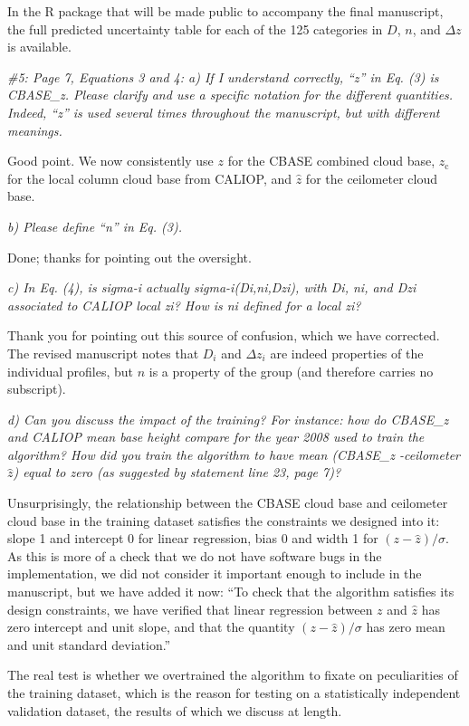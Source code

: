 \documentclass[12pt,a4paper]{responses}
\begin{document}
In the R package that will be made public to accompany the final manuscript, the
full predicted uncertainty table for each of the 125 categories in $D$, $n$, and
$\Delta z$ is available.

\textit{\#5: Page 7, Equations 3 and 4: a) If I understand correctly, “z” in Eq. (3) is CBASE\_z.
Please clarify and use a specific notation for the different quantities. Indeed, “z” is used
several times throughout the manuscript, but with different meanings.}

Good point.  We now consistently use $z$ for the CBASE combined cloud base,
$z_\text{c}$ for the local column cloud base from CALIOP, and $\hat{z}$ for the
ceilometer cloud base.

\textit{b) Please define “n” in Eq.  (3).}

Done; thanks for pointing out the oversight.

\textit{c) In Eq.  (4), is sigma-i actually sigma-i(Di,ni,Dzi), with Di, ni, and Dzi
associated to CALIOP local zi? How is ni defined for a local zi?}

Thank you for pointing out this source of confusion, which we have corrected.
The revised manuscript notes that $D_i$ and $\Delta z_i$ are indeed properties
of the individual profiles, but $n$ is a property of the group (and therefore
carries no subscript).

\textit{ d) Can you discuss the impact of the training? For instance: how do
  CBASE\_z and CALIOP mean base height compare for the year 2008 used to train
  the algorithm? How did you train the algorithm to have mean (CBASE\_z
  -ceilometer $\hat{z}$) equal to zero (as suggested by statement line 23, page
  7)?}

Unsurprisingly, the relationship between the CBASE cloud base and ceilometer
cloud base in the training dataset satisfies the constraints we designed into
it: slope 1 and intercept 0 for linear regression, bias 0 and width 1 for
$(z - \hat{z})/\sigma$.  As this is more of a check that we do not have software
bugs in the implementation, we did not consider it important enough to include
in the manuscript, but we have added it now: ``To check that the algorithm
satisfies its design constraints, we have verified that linear regression
between $z$ and $\hat{z}$ has zero intercept and unit slope, and that the
quantity $(z - \hat{z})/\sigma$ has zero mean and unit standard deviation.''


The real test is whether we overtrained the algorithm to fixate on peculiarities
of the training dataset, which is the reason for testing on a statistically
independent validation dataset, the results of which we discuss at length.
\end{document}

